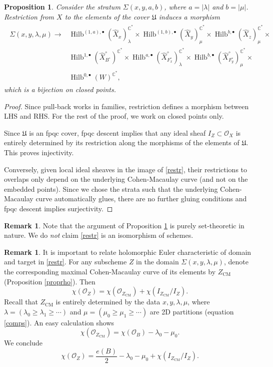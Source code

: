\documentclass{amsart}
\newtheorem{proposition}[theorem]{Proposition}
\theoremstyle{definition}
\newtheorem{remark}[theorem]{Remark}
\newcommand{\CC} {\mathbb{C}}          %
\renewcommand{\O}{\mathcal{O}}
\newcommand{\Hilb}{\operatorname{Hilb}}
\newcommand{\CM}{\operatorname{CM}}
\begin{document}
\begin{proposition} \label{bij}
Consider the stratum $\Sigma(x,y,a,b)$, where $a = |\lambda|$ and $b = |\mu|$. Restriction from $X$ to the elements of the cover $\mathfrak{U}$ induces a morphism
\begin{align}
\begin{split} \label{restr}
\Sigma(x,y,\lambda,\mu) \longrightarrow &\Hilb^{(1,a),\bullet}(\widehat{X}_x)_{\lambda}^{\CC^*} \times \Hilb^{(1,b),\bullet}(\widehat{X}_y)_{\mu}^{\CC^*} \times \Hilb^{b,\bullet}(\widehat{X}_z)_{\mu}^{\CC^*} \times \\
&\Hilb^{1,\bullet}(\widehat{X}^{\circ}_{B^\circ})^{\CC^*} \times \Hilb^{a,\bullet}(\widehat{X}^{\circ}_{F_{x}^{\circ}})_{\lambda}^{\CC^*} \times \Hilb^{b,\bullet}(\widehat{X}^{\circ}_{F_{y}^{\circ}})_{\mu}^{\CC^*} \times \\
&\Hilb^{0,\bullet}(W)^{\CC^*},
\end{split}
\end{align}
which is a bijection on closed points.
\end{proposition}
\begin{proof}
Since pull-back works in families, restriction defines a morphism between LHS and RHS. For the rest of the proof, we work on closed points only.

Since $\mathfrak{U}$ is an fpqc cover, fpqc descent implies that any ideal sheaf $I_Z \subset \O_X$ is entirely determined by its restriction along the morphisms of the elements of $\mathfrak{U}$. This proves injectivity.

Conversely, given local ideal sheaves in the image of \eqref{restr}, their restrictions to overlaps only depend on the underlying Cohen-Macaulay curve (and not on the embedded points). Since we chose the strata such that the underlying Cohen-Macaulay curve automatically glues, there are no further gluing conditions and fpqc descent implies surjectivity.
\end{proof}
   
\begin{remark}
Note that the argument of Proposition \ref{bij} is purely set-theoretic in nature. We do \emph{not} claim \eqref{restr} is an isomorphism of schemes. 
\end{remark}

\begin{remark}
It is important to relate holomorphic Euler characteristic of domain and target in \eqref{restr}. For any subscheme $Z$ in the domain $\Sigma(x,y,\lambda,\mu)$, denote the corresponding maximal Cohen-Macaulay curve of its elements by $Z_{\CM}$ (Proposition \ref{proprho}). Then
$$
\chi(\O_Z) = \chi(\O_{Z_{\CM}}) + \chi(I_{Z_{\CM}} / I_{Z}).
$$ 
Recall that $Z_{\CM}$ is entirely determined by the data $x,y, \lambda, \mu$, where $\lambda = (\lambda_0 \geq \lambda_1 \geq \cdots)$ and $\mu = (\mu_0 \geq \mu_1 \geq \cdots)$ are 2D partitions (equation \eqref{comps}). An easy calculation shows 
$$
\chi(\O_{Z_{\CM}}) = \chi(\O_B) - \lambda_0 - \mu_0.
$$
We conclude
\begin{equation} \label{relchi}
\chi(\O_Z) = \frac{e(B)}{2} - \lambda_0 - \mu_0 + \chi(I_{Z_{\CM}} / I_{Z}).
\end{equation}
\end{remark}
\end{document}
